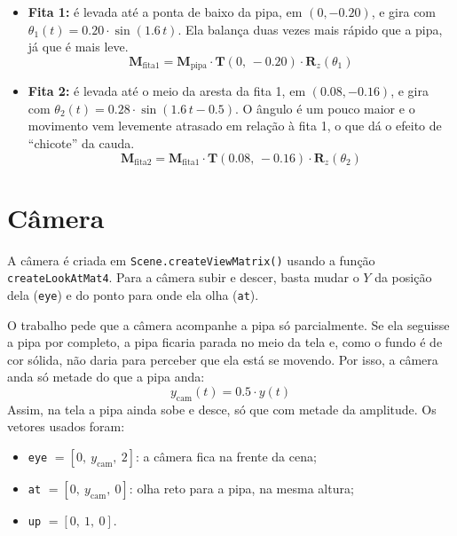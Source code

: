 \documentclass[11pt,a4paper]{article}
\begin{document}
\begin{itemize}\setlength\itemsep{0em}
    \item \textbf{Fita 1:} é levada até a ponta de baixo da pipa, em $(0, -0.20)$, e gira com $\theta_1(t) = 0.20 \cdot \sin(1.6\, t)$. Ela balança duas vezes mais rápido que a pipa, já que é mais leve.
    \[
        \mathbf{M}_{\text{fita1}} = \mathbf{M}_{\text{pipa}} \cdot \mathbf{T}(0,\, -0.20) \cdot \mathbf{R}_z(\theta_1)
    \]
    \item \textbf{Fita 2:} é levada até o meio da aresta da fita 1, em $(0.08, -0.16)$, e gira com $\theta_2(t) = 0.28 \cdot \sin(1.6\, t - 0.5)$. O ângulo é um pouco maior e o movimento vem levemente atrasado em relação à fita 1, o que dá o efeito de ``chicote'' da cauda.
    \[
        \mathbf{M}_{\text{fita2}} = \mathbf{M}_{\text{fita1}} \cdot \mathbf{T}(0.08,\, -0.16) \cdot \mathbf{R}_z(\theta_2)
    \]
\end{itemize}

\section{Câmera}
A câmera é criada em \texttt{Scene.createViewMatrix()} usando a função \texttt{createLookAtMat4}. Para a câmera subir e descer, basta mudar o $Y$ da posição dela (\texttt{eye}) e do ponto para onde ela olha (\texttt{at}).

O trabalho pede que a câmera acompanhe a pipa só parcialmente. Se ela seguisse a pipa por completo, a pipa ficaria parada no meio da tela e, como o fundo é de cor sólida, não daria para perceber que ela está se movendo. Por isso, a câmera anda só metade do que a pipa anda:
\begin{equation}
    y_{\text{cam}}(t) = 0.5 \cdot y(t)
\end{equation}
Assim, na tela a pipa ainda sobe e desce, só que com metade da amplitude. Os vetores usados foram:
\begin{itemize}\setlength\itemsep{0em}
    \item \texttt{eye} $= [0,\ y_{\text{cam}},\ 2]$: a câmera fica na frente da cena;
    \item \texttt{at} $= [0,\ y_{\text{cam}},\ 0]$: olha reto para a pipa, na mesma altura;
    \item \texttt{up} $= [0,\ 1,\ 0]$.
\end{itemize}
\end{document}
